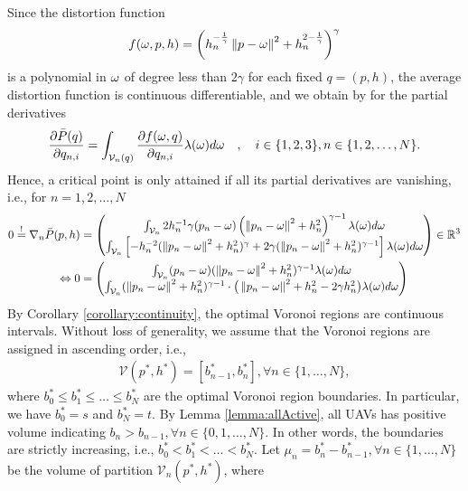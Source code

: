 \documentclass[12pt,onecolumn,final,letterpaper]{IEEEtran}
\newcommand{\df}{\ensuremath{\lam}}         %
\newcommand{\bQ}{\ensuremath{q}}          %
\newcommand{\Pbar}{\ensuremath{\bar{P}}}         %
\newcommand{\Vor}{\ensuremath{\mathcal{V}}}         %
\begin{document}
Since the distortion function 
\begin{align}
  f(\omega,p,h)= \left(h_n^{-\frac{1}{\gamma}} \left\|p-\omega\right\| ^2 + h_n^{2-\frac{1}{\gamma}}\right)^{\gamma}
\end{align}  
is a polynomial in $\omega$ of degree less than $2\gamma$ for each fixed $\bQ=(p,h)$, the average distortion function is continuous
differentiable, and we obtain by \cite[Thm.1]{WJ18} for the partial derivatives 
%
\begin{align}
  \frac{\partial \Pbar(q)}{\partial q_{n,i}} = \int_{\Vor_n(q)} \frac{\partial f(\ome,q)}{\partial q_{n,i}}
  \df(\ome)d\ome\quad,\quad i\in\{1,2,3\},n\in\{1,2,\dots,N\}.
\end{align}
%
Hence, a critical point is only attained if all its partial derivatives are vanishing, i.e.,  for  $n=1,2,\dots,N$ 
%
\begin{align}
 0\overset{!}{=} \nabla_n \Pbar(p,h) &= \begin{pmatrix} 
   \int_{\Vor_n} 2h_n^{-1} \gam (p_{n}-\ome)  \left(\Norm{p_n-\ome}^2 +h_n^2\right)^{\gam-1} 
    \df(\ome)d \ome\\
    \int_{\Vor_n} \left[-h_n^{-2}(\Norm{p_n-\ome}^2 + h_n^2)^{\gam} + 2\gam 
    (\Norm{p_n-\ome}^2 +h_n^2)^{\gam-1}\right]
    \df(\ome)d \ome
  \end{pmatrix} \in\R^3\notag\\
\LRA 0&= \begin{pmatrix}
  \int_{\Vor_n} (p_{n}-\ome) (\Norm{p_n-\ome}^2 +h_n^2)^{\gam-1} \df(\ome)d \ome\\
  \int_{\Vor_n} (\Norm{p_n-\ome}^2 +h_n^2)^{\gam-1}\cdot \big(\Norm{p_n-\ome}^2+h_n^2 - 2\gam h_n^2 \big)
  \df(\ome)d \ome
  \end{pmatrix}\label{eq:gradient}
\end{align}
%
By Corollary \ref{corollary:continuity}, the optimal Voronoi regions are continuous intervals. 
Without loss of generality, we assume that the Voronoi regions are assigned in ascending order, i.e., 
%
\begin{align}
\Vor(p^*, h^*)=[b^*_{n-1}, b^*_n], \forall n\in\{1,\dots,N\},
\label{eq:1DoptV}
\end{align}
%
where $b^*_0\le b^*_1\le\dots\le b^*_N$ are the optimal Voronoi region boundaries. In particular, we have $b^*_0=s$ and
$b^*_N=t$.  By Lemma \ref{lemma:allActive}, all UAVs has positive volume indicating $b_n > b_{n-1}, \forall
n\in\{0,1,\dots,N\}$.  In other words, the boundaries are strictly increasing, i.e., $b^*_0< b^*_1<\dots< b^*_N$.  Let
$\mu_n=b^*_n-b^*_{n-1}, \forall n\in\{1,\dots,N\}$ be the volume of partition $\Vor_n(p^*, h^*)$, where
\end{document}
